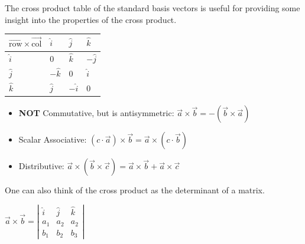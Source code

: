 \noindent
The cross product table of the standard basis vectors is useful for providing some insight into the properties of the cross product.
\begin{table}[h]
	\centering
	\begin{tabular}{|l|l|l|l|}
		\hline
		$\overrightarrow{\text{row}}\times\overrightarrow{\text{col}}$ & $\hat{i}$  & $\hat{j}$  & $\hat{k}$  \\ \hline
		$\hat{i}$                                & $0$        & $\hat{k}$  & $-\hat{j}$ \\ \hline
		$\hat{j}$                                & $-\hat{k}$ & $0$        & $\hat{i}$  \\ \hline
		$\hat{k}$                                & $\hat{j}$  & $-\hat{i}$ & $0$        \\ \hline
	\end{tabular}
\end{table}

\begin{itemize}
	\item \textbf{NOT} Commutative, but is antisymmetric: $\vec{a}\times\vec{b} = -\left(\vec{b}\times\vec{a}\right)$
	\item Scalar Associative: $\left(c\cdot\vec{a}\right)\times\vec{b}=\vec{a}\times\left(c\cdot\vec{b}\right)$
	\item Distributive: $\vec{a}\times\left(\vec{b}\times\vec{c}\right) = \vec{a}\times\vec{b} + \vec{a}\times\vec{c}$
\end{itemize}

\noindent
One can also think of the cross product as the determinant of a matrix.\\
\begin{center}
	$\vec{a}\times\vec{b} = \left| 
		\begin{matrix}
			\hat{i}& \hat{j} & \hat{k} \\
			a_1 & a_2 & a_2\\
			b_1 & b_2 & b_3 
		\end{matrix}
	\right|$
\end{center}